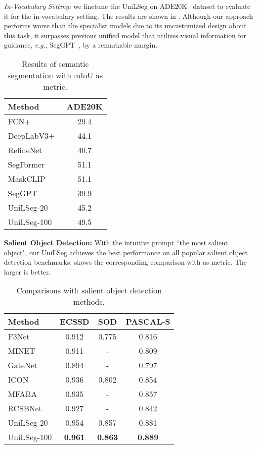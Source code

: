 \documentclass[10pt,twocolumn,letterpaper]{article}
\newcommand{\MethodName}{UniLSeg\xspace}
\begin{document}
\textit{In-Vocabulary Setting:}
we finetune the \MethodName on ADE20K~\cite{ade20k} dataset to evaluate it for the in-vocabulary setting. The results are shown in . Although our approach  performs worse than the specialist models due to its uncustomized design about this task, it surpasses previous unified model that utilizes visual information for guidance, \textit{e.g.}, SegGPT~\cite{seggpt}, by a remarkable margin. 
\begin{table}
    \centering
    \small
    \renewcommand\arraystretch{1.1}
    \caption{Results of semantic segmentation with mIoU as metric.}
    \setlength\tabcolsep{17.2pt}
    \label{tab:ss}
    \begin{tabular}{lc}
    \hline
    Method  &ADE20K   \\
    \hline
       FCN+~\cite{fcn} &29.4 \\
       DeepLabV3+~\cite{deeplabv3}  &44.1   \\
       RefineNet~\cite{refinenet}  &40.7  \\
       SegFormer~\cite{segformer} &51.1  \\
       MaskCLIP~\cite{maskformer} &51.1 \\
       SegGPT~\cite{seggpt} &39.9  \\
       \hline
       \MethodName-20 &45.2 \\
       \MethodName-100 &49.5 \\
       \hline
    \end{tabular}
\end{table} 
\vspace{5pt}
\noindent \textbf{Salient Object Detection:}
With the intuitive prompt ``the most salient object", our \MethodName achieves the best performance on all popular salient object detection benchmarks.  shows the corresponding comparison with  as metric. The larger is better. 
\begin{table}[t]
   \centering
   \small
  \renewcommand\arraystretch{1.1}
  \setlength{\tabcolsep}{11.5pt}
  \caption{Comparisons with salient object detection methods.}
\begin{tabular}{l|c|c|c}
\hline
      Method & ECSSD & SOD  & PASCAL-S\\
      \hline
      F3Net~\cite{f3net} & 0.912 & 0.775 & 0.816\\
      MINET~\cite{minet} & 0.911 & - & 0.809\\
      GateNet~\cite{gatenet} &0.894 &- &0.797 \\
ICON~\cite{icon} & 0.936 &0.802 &0.854   \\
      MFABA~\cite{mfaba} & 0.935 &- &0.857   \\
      RCSBNet~\cite{rcsbnet} & 0.927 &- &0.842   \\
      \hline
      \MethodName-20 &0.954 &0.857 &0.881\\
      \MethodName-100 &\textbf{0.961} &\textbf{0.863} &\textbf{0.889}\\
\hline
   \end{tabular}
   \label{tab:sod}
   \vspace{-5pt}
\end{table} 
\end{document}
